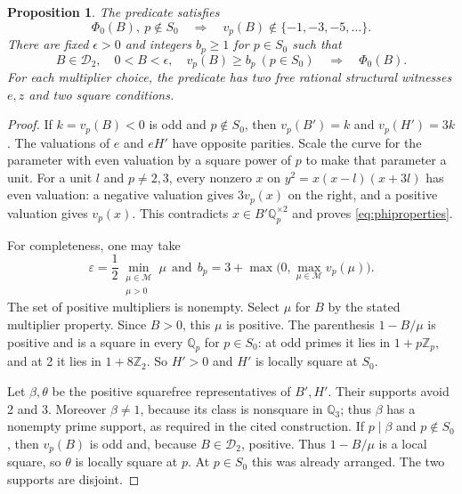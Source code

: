 \documentclass[11pt,reqno]{amsart}
\newtheorem{proposition}[theorem]{Proposition}
\theoremstyle{definition}
\numberwithin{equation}{section}
\newcommand{\Q}{\mathbb Q}
\newcommand{\Z}{\mathbb Z}
\def\t{\text}
\begin{document}
\begin{proposition}\label{prop:phi}
The predicate satisfies
\begin{equation}\label{eq:phiproperties}
 \Phi_0(B),\ p\notin S_0
 \quad\Longrightarrow\quad v_p(B)\notin\{-1,-3,-5,\ldots\}.
\end{equation}
There are fixed $\epsilon>0$ and integers $b_p\ge1$ for $p\in S_0$ such that
\begin{equation}\label{eq:smallcomplete}
 B\in\mathcal D_2,\quad 0<B<\epsilon,\quad
 v_p(B)\ge b_p\ (p\in S_0)
 \quad\Longrightarrow\quad\Phi_0(B).
\end{equation}
For each multiplier choice, the predicate has two free rational structural witnesses $e,z$ and two square conditions.
\end{proposition}
\begin{proof}
If $k=v_p(B)<0$ is odd and $p\notin S_0$, then $v_p(B')=k$ and $v_p(H')=3k$. The valuations of $e$ and $eH'$ have opposite parities. Scale the curve for the parameter with even valuation by a square power of $p$ to make that parameter a unit. For a unit $l$ and $p\ne2,3$, every nonzero $x$ on $y^2=x(x-l)(x+3l)$ has even valuation: a negative valuation gives $3v_p(x)$ on the right, and a positive valuation gives $v_p(x)$. This contradicts $x\in B'\Q_p^{\times2}$ and proves \eqref{eq:phiproperties}.

For completeness, one may take
\[
 \varepsilon=\frac12\min_{\substack{\mu\in\mathcal M\\\mu>0}}\mu\ \ \t{and}\ 
 \ 
 b_p=3+\max\bigl(0,\max_{\mu\in\mathcal M}v_p(\mu)\bigr).
\]
The set of positive multipliers is nonempty. Select $\mu$ for $B$ by the stated multiplier property. Since $B>0$, this $\mu$ is positive. The parenthesis $1-B/\mu$ is positive and is a square in every $\Q_p$ for $p\in S_0$: at odd primes it lies in $1+p\Z_p$, and at 2 it lies in $1+8\Z_2$. So $H'>0$ and $H'$ is locally square at $S_0$.

Let $\beta,\theta$ be the positive squarefree representatives of $B',H'$. Their supports avoid 2 and 3. Moreover $\beta\ne1$, because its class is nonsquare in $\Q_3$; thus $\beta$ has a nonempty prime support, as required in the cited construction. If $p\mid\beta$ and $p\notin S_0$, then $v_p(B)$ is odd and, because $B\in\mathcal D_2$, positive. Thus $1-B/\mu$ is a local square, so $\theta$ is locally square at $p$. At $p\in S_0$ this was already arranged. The two supports are disjoint.


\end{proof}
\end{document}
